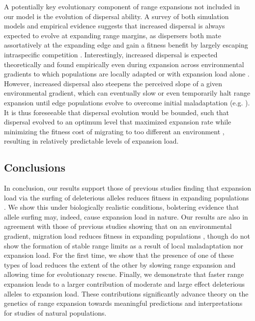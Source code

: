 A potentially key evolutionary component of range expansions not included in our model is the evolution of dispersal ability. A survey of both simulation models and empirical evidence suggests that increased dispersal is always expected to evolve at expanding range margins, as dispersers both mate assortatively at the expanding edge and gain a fitness benefit by largely escaping intraspecific competition \citep{Hargreaves:2014}. Interestingly, increased dispersal is expected theoretically and found empirically even during expansion across environmental gradients to which populations are locally adapted or with expansion load alone \citep{Henry:2015b}. However, increased dispersal also steepens the perceived slope of a given environmental gradient, which can eventually slow or even temporarily halt range expansion until edge populations evolve to overcome initial maladaptation (e.g. \citealt{Phillips:2012}). It is thus foreseeable that dispersal evolution would be bounded, such that dispersal evolved to an optimum level that maximized expansion rate while minimizing the fitness cost of migrating to too different an environment \citep{Kubisch:2013, Hargreaves:2014b}, resulting in relatively predictable levels of expansion load.


\subsection*{Conclusions}

In conclusion, our results support those of previous studies finding that expansion load via the surfing of deleterious alleles reduces fitness in expanding populations \citep{Peischl:2013, Peischl:2015, Peischl:2015b}. We show this under biologically realistic conditions, bolstering evidence that allele surfing may, indeed, cause expansion load in nature. Our results are also in agreement with those of previous studies showing that on an environmental gradient, migration load reduces fitness in expanding populations \citep{Kirkpatrick:1997, Bridle:2010, Polechova:2015}, though do not show the formation of stable range limits as a result of local maladaptation nor expansion load. For the first time, we show that the presence of one of these types of load reduces the extent of the other by slowing range expansion and allowing time for evolutionary rescue. Finally, we demonstrate that faster range expansion leads to a larger contribution of moderate and large effect deleterious alleles to expansion load. These contributions significantly advance theory on the genetics of range expansion towards meaningful predictions and interpretations for studies of natural populations.

